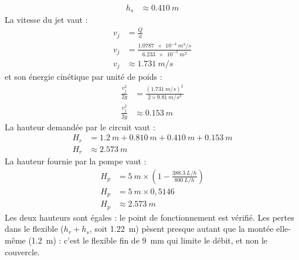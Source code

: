 \begin{demonstration}
\begin{align*}
h_s &\approx \qty{0,410}{m}
\end{align*}
La vitesse du jet vaut :
\begin{align*}
v_j &= \frac{Q}{a}\\
v_j &= \frac{\qty{1,0787e-4}{m^3/s}}{\qty{6,233e-5}{m^2}}\\
v_j &\approx \qty{1,731}{m/s}
\end{align*}
et son énergie cinétique par unité de poids :
\begin{align*}
\frac{v_j^2}{2g} &= \frac{(\qty{1,731}{m/s})^2}{2\times\qty{9,81}{m/s^2}}\\
\frac{v_j^2}{2g} &\approx \qty{0,153}{m}
\end{align*}
La hauteur demandée par le circuit vaut :
\begin{align*}
H_r &= \qty{1,2}{m} + \qty{0,810}{m} + \qty{0,410}{m} + \qty{0,153}{m}\\
H_r &\approx \qty{2,573}{m}
\end{align*}
La hauteur fournie par la pompe vaut :
\begin{align*}
H_p &= \qty{5}{m}\times\left(1 - \frac{\qty{388,3}{L/h}}{\qty{800}{L/h}}\right)\\
H_p &= \qty{5}{m}\times 0,5146\\
H_p &\approx \qty{2,573}{m}
\end{align*}
Les deux hauteurs sont égales : le point de fonctionnement est vérifié. Les pertes dans le flexible ($h_r + h_s$, soit \qty{1,22}{m}) pèsent presque autant que la montée elle-même (\qty{1,2}{m}) : c'est le flexible fin de \qty{9}{mm} qui limite le débit, et non le couvercle.
\end{demonstration}

